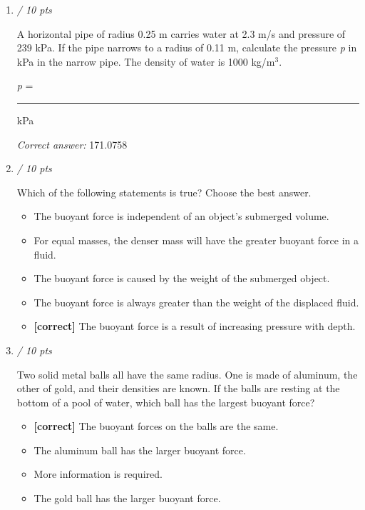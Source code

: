 \documentclass[11pt]{article}
\begin{document}
\begin{enumerate}[leftmargin=*,label=\textbf{Question \arabic*.}]
\textit{Correct answer: } 12.7546

\item \hfill \textit{/ 10 pts}

A horizontal pipe of radius 0.25 m carries water at 2.3 m/s and pressure of 239 kPa. If the pipe narrows to a radius of 0.11 m, calculate the pressure \emph{p} in kPa in the narrow pipe. The density of water is 1000 kg/m$^{3}$.



\emph{p} = \rule{2cm}{0.4pt} kPa

\textit{Correct answer: } 171.0758

\item \hfill \textit{/ 10 pts}

Which of the following statements is true? Choose the best answer.

\begin{itemize}
  \item The buoyant force is independent of an object’s submerged volume.
  \item For equal masses, the denser mass will have the greater buoyant force in a fluid.
  \item The buoyant force is caused by the weight of the submerged object.
  \item The buoyant force is always greater than the weight of the displaced fluid.
  \item \textbf{[correct]} The buoyant force is a result of increasing pressure with depth.
\end{itemize}

\item \hfill \textit{/ 10 pts}

Two solid metal balls all have the same radius. One is made of aluminum, the other of gold, and their densities are known. If the balls are resting at the bottom of a pool of water, which ball has the largest buoyant force?

\begin{itemize}
  \item \textbf{[correct]} The buoyant forces on the balls are the same.
  \item The aluminum ball has the larger buoyant force.
  \item More information is required.
  \item The gold ball has the larger buoyant force.
\end{itemize}

\end{enumerate}
\end{document}
